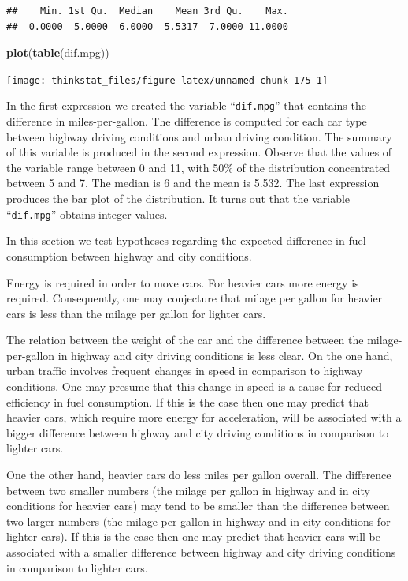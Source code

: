 \documentclass[]{krantz}
\makeatletter
\newenvironment{Shaded}{\begin{snugshade}}{\end{snugshade}}
\newcommand{\KeywordTok}[1]{\textcolor[rgb]{0.13,0.29,0.53}{\textbf{#1}}}
\newcommand{\NormalTok}[1]{#1}
\newenvironment{kframe}{%
\medskip{}
\setlength{\fboxsep}{.8em}
 \def\at@end@of@kframe{}%
 \ifinner\ifhmode%
  \def\at@end@of@kframe{\end{minipage}}%
  \begin{minipage}{\columnwidth}%
 \fi\fi%
 \def\FrameCommand##1{\hskip\@totalleftmargin \hskip-\fboxsep
 \colorbox{shadecolor}{##1}\hskip-\fboxsep
     \hskip-\linewidth \hskip-\@totalleftmargin \hskip\columnwidth}%
 \MakeFramed {\advance\hsize-\width
   \@totalleftmargin\z@ \linewidth\hsize
   \@setminipage}}%
 {\par\unskip\endMakeFramed%
 \at@end@of@kframe}
\renewenvironment{Shaded}{\begin{kframe}}{\end{kframe}}
\theoremstyle{definition}
\theoremstyle{definition}
\theoremstyle{definition}
\theoremstyle{remark}
\makeatother
\begin{document}
\begin{verbatim}
##    Min. 1st Qu.  Median    Mean 3rd Qu.    Max. 
##  0.0000  5.0000  6.0000  5.5317  7.0000 11.0000
\end{verbatim}

\begin{Shaded}
\begin{Highlighting}[]
\KeywordTok{plot}\NormalTok{(}\KeywordTok{table}\NormalTok{(dif.mpg))}
\end{Highlighting}
\end{Shaded}

\begin{center}\texttt{[image: thinkstat\_files/figure-latex/unnamed-chunk-175-1]} \end{center}

In the first expression we created the variable ``\texttt{dif.mpg}''
that contains the difference in miles-per-gallon. The difference is
computed for each car type between highway driving conditions and urban
driving condition. The summary of this variable is produced in the
second expression. Observe that the values of the variable range between
0 and 11, with 50\% of the distribution concentrated between 5 and 7.
The median is 6 and the mean is 5.532. The last expression produces the
bar plot of the distribution. It turns out that the variable
``\texttt{dif.mpg}'' obtains integer values.

In this section we test hypotheses regarding the expected difference in
fuel consumption between highway and city conditions.

Energy is required in order to move cars. For heavier cars more energy
is required. Consequently, one may conjecture that milage per gallon for
heavier cars is less than the milage per gallon for lighter cars.

The relation between the weight of the car and the difference between
the milage-per-gallon in highway and city driving conditions is less
clear. On the one hand, urban traffic involves frequent changes in speed
in comparison to highway conditions. One may presume that this change in
speed is a cause for reduced efficiency in fuel consumption. If this is
the case then one may predict that heavier cars, which require more
energy for acceleration, will be associated with a bigger difference
between highway and city driving conditions in comparison to lighter
cars.

One the other hand, heavier cars do less miles per gallon overall. The
difference between two smaller numbers (the milage per gallon in highway
and in city conditions for heavier cars) may tend to be smaller than the
difference between two larger numbers (the milage per gallon in highway
and in city conditions for lighter cars). If this is the case then one
may predict that heavier cars will be associated with a smaller
difference between highway and city driving conditions in comparison to
lighter cars.
\end{document}
